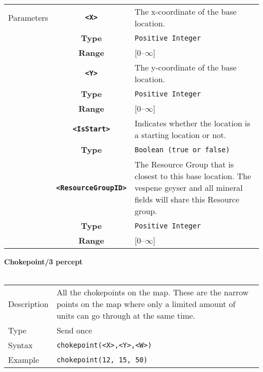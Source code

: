  \begin{tabularx}{\textwidth}{l | c | p{8cm}|}
 \cline{2-3}
 Parameters & \textbf{\verb|<X>|} & The x-coordinate of the base location.\\
            & \textbf{Type} & \verb|Positive Integer| \\
            & \textbf{Range} & [0--$\infty$] \\
            \cline{2-3}
            & \textbf{\verb|<Y>|} & The y-coordinate of the base location.\\
            & \textbf{Type} & \verb|Positive Integer| \\
            & \textbf{Range} & [0--$\infty$] \\
            \cline{2-3}
            & \textbf{\verb|<IsStart>|} & Indicates whether the location is a starting location or not. \\
            & \textbf{Type} & \verb|Boolean (true or false)| \\
            \cline{2-3}
            & \textbf{\verb|<ResourceGroupID>|} & The Resource Group that is closest to this base location. The vespene geyser and all mineral fields will share this Resource group. \\
            & \textbf{Type} & \verb|Positive Integer| \\
            & \textbf{Range} & [0--$\infty$] \\
            \cline{2-3}
\end{tabularx}
\newpage
\noindent
\textbf{Chokepoint/3 percept}\\
\\
\begin{tabularx}{\textwidth}{lX}
 Description & All the chokepoints on the map. These are the narrow points on the map where only a limited amount of units can go through at the same time.  \\
 Type & Send once \\
 Syntax & \verb|chokepoint(<X>,<Y>,<W>)| \\
 Example & \verb|chokepoint(12, 15, 50)| \\
 \end{tabularx}
